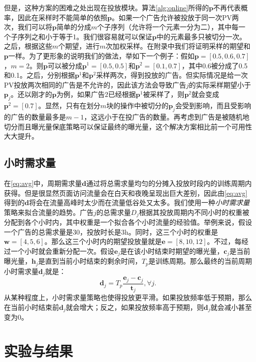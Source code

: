 \begin{enumerate}[1)]
	但是，这种方案的困难之处出现在投放模块。算法\ref{alg:online}所得的$\bm{p}$不再代表概率，因此在采样时不能简单的依照$\bm{p}$。如果一个广告允许被投放于同一次PV两次，我们可以将$\bm{p}$简单的分成$m$个子序列（允许将一个元素一分为二），其中每一个子序列之和小于等于1。我们很容易就可以保证$\bm{p}$中的元素最多只被切分一次。之后，根据这些$m$个期望，进行$m$次加权采样。在附录中我们将证明采样的期望和$\bm{p}$一样。为了更形象的说明我们的做法，举如下一个例子：假如$\bm{p} = [0.5, 0.6, 0.7]$，$m=2$。则$\bm{p}$可以被分成$\bm{p}^1 = [0.5, 0.5]$和$\bm{p}^2 = [0.1, 0.7]$，其中0.6被分成了0.5和0.1。之后，分别根据$\bm{p}^1$和$\bm{p}^2$采样两次，得到投放的广告。但实际情况是给一次PV投放两次相同的广告是不允许的，因此该方法会导致广告$j$的实际采样期望小于$\bm{p}_j$。还以刚才的$\bm{p}$为例，如果广告$2$已经根据$\bm{p}^1$被采样了，则$\bm{p}^2$就会变成$\bm{p}^2 = [0.7]$。显然，只有在划分$m$块的操作中被切分的$\bm{p}_j$会受到影响，而且受影响的广告的数量最多是$m-1$，这远小于在投广告的数量。再考虑到广告是被随机地切分而且曝光量保底策略可以保证最终的曝光量，这个解决方案相比前一个可用性大大提升。
	\end{enumerate}

\subsection{小时需求量} \label{subsec:hourly_d}

在\eqref{eq:avg}中，周期需求量$\bm{d}$通过将总需求量均匀的分摊入投放时段内的训练周期内获得。但是很显然页面访问流量会在白天和夜晚呈现出巨大差别，因此由\eqref{eq:avg}得到的$\bm{d}$将会在流量高峰时太少而在流量低谷处又太多。我们使用一种\textit{小时需求量}策略来拟合流量的趋势。广告$j$的总需求量$D_j$根据其投放周期内不同小时的权重被分配到各个小时内，其中权重是一个拟合各个小时流量的经验值。举例来说，假设一个广告的总需求量是30，投放时长是3h。同时，这三个小时的权重是$\bm{w} = [4, 5, 6]$。那么这三个小时内的期望投放量就是$\bm{e} = [8, 10, 12]$。不过，每经过一个小时就会重新分配一次。假设$\bm{e}_j$是在该小时结束时期望的曝光量，$\bm{c}_j$是当前曝光量，$\bm{h}_j$是直到当前小时结束的剩余时间，$T_p$是训练周期。那么最终的当前周期小时需求量$\bm{d}_j$就是：
\begin{equation}
\bm{d}_j = T_{p}\frac{\bm{e}_j - \bm{c}_j}{\bm{t}_j}, \forall j.
\end{equation}
从某种程度上，小时需求量策略也使得投放更平滑。如果投放频率低于预期，那么在当前小时结束前$\bm{d}_j$就会增大；反之，如果投放频率高于预期，则$\bm{d}_j$就会减小甚至变为0。

\section{实验与结果}



